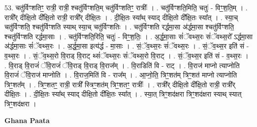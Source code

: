 \documentclass[17pt]{extarticle}
\begin{document}
53. चतु॑र्विꣳशतिꣳ॒॒ रात्री॒ रात्री॒ श्चतु॑र्विꣳशति॒म् चतु॑र्विꣳशतिꣳ॒॒ रात्रीः᳚ । . चतु॑र्विꣳशति॒मिति॒ चतुः॑ - विꣳ॒॒श॒ति॒म् । . रात्री᳚र् दीक्षि॒तो दी᳚क्षि॒तो रात्री॒ रात्री᳚र् दीक्षि॒तः । . दी॒क्षि॒तः स्या᳚थ् स्याद् दीक्षि॒तो दी᳚क्षि॒तः स्या᳚त् । . स्या॒च् चतु॑र्विꣳशति॒ श्चतु॑र्विꣳशति स्याथ् स्या॒च् चतु॑र्विꣳशतिः । . चतु॑र्विꣳशति रर्द्धमा॒सा अ॑र्द्धमा॒सा श्चतु॑र्विꣳशति॒ श्चतु॑र्विꣳशति रर्द्धमा॒साः । . चतु॑र्विꣳशति॒रिति॒ चतुः॑ - विꣳ॒॒श॒तिः॒ । . अ॒र्द्ध॒मा॒साः सं॑ॅवथ्स॒रः सं॑ॅवथ्स॒रो᳚ ऽर्द्धमा॒सा अ॑र्द्धमा॒साः सं॑ॅवथ्स॒रः । . अ॒र्द्ध॒मा॒सा इत्य॑र्द्ध - मा॒साः । . सं॒ॅव॒थ्स॒रः सं॑ॅवथ्स॒रः । . सं॒ॅव॒थ्स॒र इति॑ सं - व॒थ्स॒रः । . सं॒ॅव॒थ्स॒रो वि॒राड् वि॒राट् थ्सं॑ॅवथ्स॒रः सं॑ॅवथ्स॒रो वि॒राट् । . सं॒ॅव॒थ्स॒र इति॑ सं - व॒थ्स॒रः । . वि॒राड् वि॒राजं॑ ॅवि॒राजं॑ ॅवि॒राड् वि॒राड् वि॒राज᳚म् । . वि॒राडिति॑ वि - राट् । . वि॒राज॑ माप्नो त्याप्नोति वि॒राजं॑ ॅवि॒राज॑ माप्नोति । . वि॒राज॒मिति॑ वि - राज᳚म् । . आ॒प्नो॒ति॒ त्रिꣳ॒॒शत॑म् त्रिꣳ॒॒शत॑ माप्नो त्याप्नोति त्रिꣳ॒॒शत᳚म् । . त्रिꣳ॒॒शतꣳ॒॒ रात्री॒ रात्री᳚ स्त्रिꣳ॒॒शत॑म् त्रिꣳ॒॒शतꣳ॒॒ रात्रीः᳚ । . रात्री᳚र् दीक्षि॒तो दी᳚क्षि॒तो रात्री॒ रात्री᳚र् दीक्षि॒तः । . दी॒क्षि॒तः स्या᳚थ् स्याद् दीक्षि॒तो दी᳚क्षि॒तः स्या᳚त् । . स्या॒त् त्रिꣳ॒॒शद॑क्षरा त्रिꣳ॒॒शद॑क्षरा स्याथ् स्यात् त्रिꣳ॒॒शद॑क्षरा । \newline

\textbf{Ghana Paata } \newline
\end{document}
